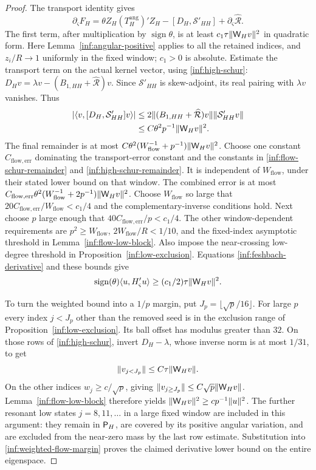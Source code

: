 \begin{proof}
The transport identity gives
\[
 \partial_{\varsigma}F_H
 =\theta Z_H(T_H^{\mathrm{ang}})'Z_H
          -[D_H,\mathcal S'_{HH}]+\partial_\varsigma\widehat{\mathcal R}.
\]
The first term, after multiplication by $\operatorname{sign}\theta$,
is at least $c_1\tau\lVert \mathsf W_Hv\rVert^2$ in quadratic form.
Here Lemma~\ref{inf:angular-positive} applies to all the retained
indices, and $z_i/R\to1$ uniformly in the fixed window; $c_1>0$
is absolute.
Estimate the transport term on the actual kernel vector, using
\eqref{inf:high-schur}:
$D_Hv=\lambda v-(B_{1,HH}+\widehat{\mathcal R})v$.
Since $\mathcal S'_{HH}$ is skew-adjoint, its real pairing with $\lambda v$
vanishes. Thus
\begin{align*}
 |\langle v,[D_H,\mathcal S'_{HH}]v\rangle|
 &\le2\lVert (B_{1,HH}+\widehat{\mathcal R})v\rVert
                                  \lVert \mathcal S'_{HH}v\rVert\\
 &\le C\theta^2p^{-1}\lVert \mathsf W_Hv\rVert^2.
\end{align*}
The final remainder is at most
$C\theta^2(W_{\mathrm{flow}}^{-1}+p^{-1})
\lVert \mathsf W_Hv\rVert^2$.
Choose one constant $C_{\mathrm{flow,err}}$ dominating the
transport-error constant and the constants in
\eqref{inf:flow-schur-remainder} and
\eqref{inf:high-schur-remainder}. It is independent of
$W_{\mathrm{flow}}$, under their stated lower bound on that
window. The combined error is at most
$C_{\mathrm{flow,err}}\theta^2(W_{\mathrm{flow}}^{-1}+2p^{-1})
\lVert \mathsf W_Hv\rVert^2$.
Choose $W_{\mathrm{flow}}$ so large that
$20C_{\mathrm{flow,err}}/W_{\mathrm{flow}}<c_1/4$ and the
complementary-inverse conditions hold. Next choose $p$ large
enough that $40C_{\mathrm{flow,err}}/p<c_1/4$.
The other window-dependent requirements are
$p^2\ge W_{\mathrm{flow}}$, $2W_{\mathrm{flow}}/R<1/10$,
and the fixed-index asymptotic threshold in
Lemma~\ref{inf:flow-low-block}. Also impose the near-crossing
low-degree threshold in Proposition~\ref{inf:low-exclusion}. Equations
\eqref{inf:feshbach-derivative} and these bounds give
\begin{equation}\label{inf:weighted-flow-margin}
 \operatorname{sign}(\theta)\langle u,H'_{\varsigma}u\rangle
 \ge(c_1/2)\tau\lVert \mathsf W_Hv\rVert^2.
\end{equation}

To turn the weighted bound into a $1/p$ margin, put
$J_p=\lfloor\sqrt p/16\rfloor$.
For large $p$ every index $j<J_p$ other than the removed seed is in
the exclusion range of Proposition~\ref{inf:low-exclusion}.
Its ball offset has modulus greater than $32$.
On those rows of \eqref{inf:high-schur}, invert $D_H-\lambda$,
whose inverse norm is at most $1/31$, to get
\[
 \lVert v_{j<J_p}\rVert\le C\tau\lVert \mathsf W_Hv\rVert.
\]
On the other indices $w_j\ge c/\sqrt p$, giving
$\lVert v_{j\ge J_p}\rVert\le C\sqrt p\lVert \mathsf W_Hv\rVert$.
Lemma~\ref{inf:flow-low-block} therefore yields
$\lVert \mathsf W_Hv\rVert^2\ge cp^{-1}\lVert u\rVert^2$.
The further resonant low states $j=8,11,\ldots$ in a large fixed
window are included in this argument: they remain in $\mathsf P_H$,
are covered by its positive angular variation, and are excluded
from the near-zero mass by the last row estimate.
Substitution into \eqref{inf:weighted-flow-margin} proves the
claimed derivative lower bound on the entire eigenspace.


\end{proof}
